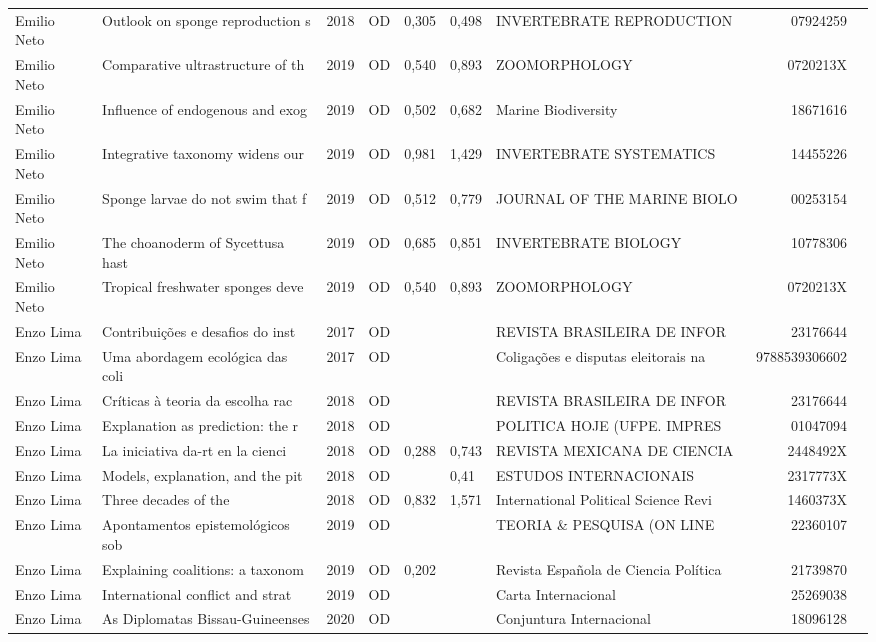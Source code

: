 \documentclass[12pt,brazil]{article}\usepackage[]{graphicx}\usepackage[]{xcolor}
\begin{document}
\begin{longtable}{lllrrllrr}
Emilio Neto & Outlook on sponge reproduction s & 2018 & OD & 0,305 & 0,498 & INVERTEBRATE REPRODUCTION \ & 07924259 \\
Emilio Neto & Comparative ultrastructure of th & 2019 & OD & 0,540 & 0,893 & ZOOMORPHOLOGY & 0720213X \\
Emilio Neto & Influence of endogenous and exog & 2019 & OD & 0,502 & 0,682 & Marine Biodiversity & 18671616 \\
Emilio Neto & Integrative taxonomy widens our  & 2019 & OD & 0,981 & 1,429 & INVERTEBRATE SYSTEMATICS & 14455226 \\
Emilio Neto & Sponge larvae do not swim that f & 2019 & OD & 0,512 & 0,779 & JOURNAL OF THE MARINE BIOLO & 00253154 \\
Emilio Neto & The choanoderm of Sycettusa hast & 2019 & OD & 0,685 & 0,851 & INVERTEBRATE BIOLOGY & 10778306 \\
Emilio Neto & Tropical freshwater sponges deve & 2019 & OD & 0,540 & 0,893 & ZOOMORPHOLOGY & 0720213X \\
Enzo Lima & Contribuições e desafios do inst & 2017 & OD &  &  & REVISTA BRASILEIRA DE INFOR & 23176644 \\
Enzo Lima & Uma abordagem ecológica das coli & 2017 & OD &  &  & Coligações e disputas eleitorais na  & 9788539306602 \\
Enzo Lima & Críticas à teoria da escolha rac & 2018 & OD &  &  & REVISTA BRASILEIRA DE INFOR & 23176644 \\
Enzo Lima & Explanation as prediction: the r & 2018 & OD &  &  & POLITICA HOJE (UFPE. IMPRES & 01047094 \\
Enzo Lima & La iniciativa da-rt en la cienci & 2018 & OD & 0,288 & 0,743 & REVISTA MEXICANA DE CIENCIA & 2448492X \\
Enzo Lima & Models, explanation, and the pit & 2018 & OD &  & 0,41 & ESTUDOS INTERNACIONAIS & 2317773X \\
Enzo Lima & Three decades of the             & 2018 & OD & 0,832 & 1,571 & International Political Science Revi & 1460373X \\
Enzo Lima & Apontamentos epistemológicos sob & 2019 & OD &  &  & TEORIA \& PESQUISA (ON LINE & 22360107 \\
Enzo Lima & Explaining coalitions: a taxonom & 2019 & OD & 0,202 &  & Revista Española de Ciencia Política & 21739870 \\
Enzo Lima & International conflict and strat & 2019 & OD &  &  & Carta Internacional & 25269038 \\
Enzo Lima & As Diplomatas Bissau-Guineenses  & 2020 & OD &  &  & Conjuntura Internacional & 18096128 \\

\end{longtable}
\end{document}
